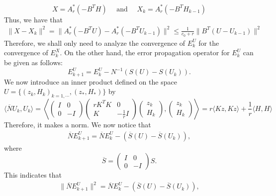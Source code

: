 \begin{equation}
X = A_r^* (-B^TH) \quad \mbox{ and } \quad X_{k} = A_r^* (-B^T H_{k-1})
\end{equation}
Thus, we have that 
\begin{eqnarray*}
\|X - X_k\|^2 = \|A_r^* (-B^TU) - A_r^* (-B^T U_{k-1})\|^{2} \leq \frac{1}{c_0 + r} \|B^T( U - U_{k-1})\|^2 
\end{eqnarray*}
Therefore, we shall only need to analyze the convergence of $E_k^U$ for the convergence of $E_k^X$. On the other hand, the error propagation operator for $E_k^U$ can be given as follows: 
\begin{equation}
E_{k+1}^U = E_k^U - N^{-1} (S(U) - S(U_k)). 
\end{equation}
We now introduce an inner product defined on the space $U = \{(z_k, H_k)_{k=1,\cdots}, (z_*, H_*) \}$ by 
\begin{equation}
\langle \overline{N} U_k, U_k \rangle = \left \langle 
\begin{pmatrix}
I & 0\\
0 & -I
\end{pmatrix}
\begin{pmatrix}
r K^T K & 0\\
K & -\frac{1}{r} I
\end{pmatrix} \begin{pmatrix}
z_k \\
H_k
\end{pmatrix},  \begin{pmatrix}
z_k \\
H_k
\end{pmatrix} \right \rangle = r \langle Kz, Kz \rangle + \frac{1}{r} \langle H, H \rangle  
\end{equation}
Therefore, it makes a norm. We now notice that
\begin{eqnarray} 
\overline{N} E_{k+1}^U = \overline{N} E_k^U - (\overline{S}(U) - \overline{S}(U_k)), 
\end{eqnarray} 
where 
\begin{equation} 
\overline{S} = \begin{pmatrix}
I & 0\\
0 & -I
\end{pmatrix} S.
\end{equation} 
This indicates that 
\begin{eqnarray*}
\|\overline{N} E_{k+1}^U\|^2 = \overline{N} E_k^U - (\overline{S}(U) - \overline{S}(U_k)), 
\end{eqnarray*}

